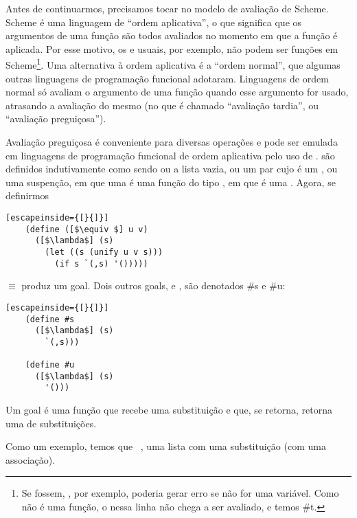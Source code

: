\documentclass{article}
\begin{document}
  Antes de continuarmos, precisamos tocar no modelo de avaliação de
  Scheme. Scheme é uma linguagem de ``ordem aplicativa'', o que
  significa que os argumentos de uma função são todos avaliados no
  momento em que a função é aplicada. Por esse motivo, os
   e  usuais, por exemplo, não podem ser
  funções em Scheme\footnote{Se fossem, , por
    exemplo, poderia gerar erro se  não for uma
    variável. Como  não é uma função, o 
    nessa linha não chega a ser avaliado, e temos 
    \seta \#t.}. Uma alternativa à ordem aplicativa é a ``ordem
  normal'', que algumas outras linguagens de programação funcional
  adotaram. Linguagens de ordem normal só avaliam o argumento de uma
  função quando esse argumento for usado, atrasando a avaliação do
  mesmo (no que é chamado ``avaliação tardia'', ou ``avaliação
  preguiçosa'').

  Avaliação preguiçosa é conveniente para diversas operações e pode
  ser emulada em linguagens de programação funcional de ordem
  aplicativa pelo uso de .  são
  definidos indutivamente como sendo ou a lista vazia, ou um par cujo
   é um , ou uma suspenção, em que
  uma  é uma função do tipo , em que  é uma
  . Agora, se definirmos

  \begin{lstlisting}[escapeinside={[}{]}]
    (define ([$\equiv $] u v)
      ([$\lambda$] (s)
        (let ((s (unify u v s)))
          (if s `(,s) '()))))
  \end{lstlisting}
        
  \noindent $\equiv $ produz um goal. Dois outros goals, 
  e , são denotados \#s e \#u:\\

  \begin{lstlisting}[escapeinside={[}{]}]
    (define #s
      ([$\lambda$] (s)
        `(,s)))

    (define #u
      ([$\lambda$] (s)
        '()))
  \end{lstlisting}

  Um goal é uma função que recebe uma substituição e que, se retorna,
  retorna uma  de substituições.

  Como um exemplo, temos que  \seta\
  , uma lista com uma substituição (com uma
  associação).
\end{document}
